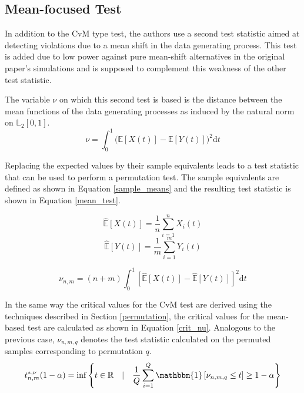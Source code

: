 \documentclass[12pt, a4paper]{article}
\theoremstyle{MAstyle} \newtheorem{assumption}{Assumption}[section]
\theoremstyle{MAstyle} \newtheorem{definition}{Definition}[section]
\theoremstyle{MAstyle} \newtheorem{theorem}{Theorem}[section]
\begin{document}
		\subsection{Mean-focused Test}\label{mean_based_test}
			In addition to the CvM type test, the authors use a second test statistic aimed at detecting violations due to a mean shift in the data generating process. This test is added due to low power against pure mean-shift alternatives in the original paper's simulations and is supposed to complement this weakness of the other test statistic.
			
			The variable $\nu$ on which this second test is based is the distance between the mean functions of the data generating processes as induced by the natural norm on $\mathbb{L}_2[0,1]$.
			\begin{equation}
				\nu = \int_{0}^{1} \big(\mathbb{E}\left[X(t)\right] - \mathbb{E}\left[Y(t)\right]\big)^2 \mathrm{d}t
			\end{equation}
		
			Replacing the expected values by their sample equivalents leads to a test statistic that can be used to perform a permutation test. The sample equivalents are defined as shown in Equation \ref{sample_means} and the resulting test statistic is shown in Equation \ref{mean_test}.
			\begin{multicols}{2}
				\noindent
				\begin{equation*}
					\hat{\mathbb{E}}\left[X(t)\right] = \frac{1}{n}\sum_{i = 1}^{n} X_i(t)
				\end{equation*}
				\begin{equation}\label{sample_means}
					\hat{\mathbb{E}}\left[Y(t)\right] = \frac{1}{m}\sum_{i = 1}^{m} Y_i(t)
				\end{equation}
			\end{multicols}
			\begin{equation}\label{mean_test}
				\nu_{n,m} = (n+m) \int_{0}^{1} \left[\hat{\mathbb{E}}\left[X(t)\right] - \hat{\mathbb{E}}\left[Y(t)\right] \right]^2 \mathrm{d}t
			\end{equation}
		
			In the same way the critical values for the CvM test are derived using the techniques described in Section \ref{permutation}, the critical values for the mean-based test are calculated as shown in Equation \ref{crit_nu}. Analogous to the previous case, $\nu_{n,m,q}$ denotes the test statistic  calculated on the permuted samples corresponding to permutation $q$.
			\begin{equation}\label{crit_nu}
				t^{*, \nu}_{n,m}(1-\alpha) = \inf \left\{t \in \mathbb{R} \quad \vert \quad \frac{1}{Q} \sum_{i = 1}^{Q} \mathbbm{1}\left[\nu_{n,m,q} \leq t\right] \geq 1 - \alpha \right\}
			\end{equation}
		
\end{document}

